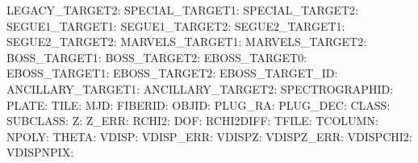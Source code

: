 LEGACY\_TARGET2:  \newline 
SPECIAL\_TARGET1:  \newline 
SPECIAL\_TARGET2:  \newline 
SEGUE1\_TARGET1:  \newline 
SEGUE1\_TARGET2:  \newline 
SEGUE2\_TARGET1:  \newline 
SEGUE2\_TARGET2:  \newline 
MARVELS\_TARGET1:  \newline 
MARVELS\_TARGET2:  \newline 
BOSS\_TARGET1:  \newline 
BOSS\_TARGET2:  \newline 
EBOSS\_TARGET0:  \newline 
EBOSS\_TARGET1:  \newline 
EBOSS\_TARGET2:  \newline 
EBOSS\_TARGET\_ID:  \newline 
ANCILLARY\_TARGET1:  \newline 
ANCILLARY\_TARGET2:  \newline 
SPECTROGRAPHID:  \newline 
PLATE:  \newline 
TILE:  \newline 
MJD:  \newline 
FIBERID:  \newline 
OBJID:  \newline 
PLUG\_RA:  \newline 
PLUG\_DEC:  \newline 
CLASS:  \newline 
SUBCLASS:  \newline 
Z:  \newline 
Z\_ERR:  \newline 
RCHI2:  \newline 
DOF:  \newline 
RCHI2DIFF:  \newline 
TFILE:  \newline 
TCOLUMN:  \newline 
NPOLY:  \newline 
THETA:  \newline 
VDISP:  \newline 
VDISP\_ERR:  \newline 
VDISPZ:  \newline 
VDISPZ\_ERR:  \newline 
VDISPCHI2:  \newline 
VDISPNPIX:  \newline 
